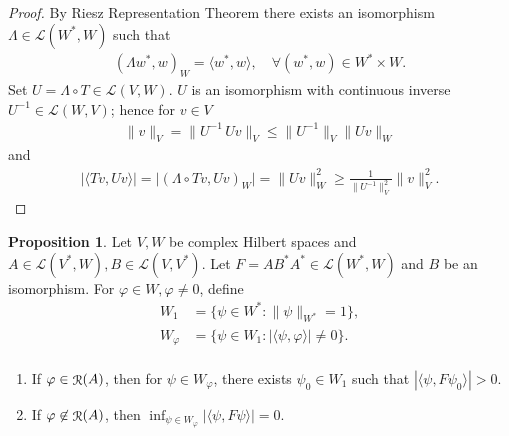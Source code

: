 \documentclass[a4paper,12pt]{article}
\theoremstyle{definition}
\newtheorem{prp}{Proposition}
\DeclareMathOperator\img{\EuScript{R}}
\begin{document}
\begin{proof}
  By Riesz Representation Theorem there exists an isomorphism $\Lambda\in\mathcal{L}(W^*, W)$ such that
  \begin{align*}
    (\Lambda w^*, w)_W = \langle w^*, w\rangle,\quad\forall(w^*, w)\in W^*\times W. 
  \end{align*}
  Set $U = \Lambda\circ T\in\mathcal{L}(V, W)$. $U$ is an isomorphism with continuous inverse $U^{-1}\in\mathcal{L}(W, V)$; hence for $v\in V$
  \begin{align*}
    \|v\|_V=\|U^{-1}\,Uv\|_V\leqslant\|U^{-1}\|_V\|Uv\|_W 
  \end{align*}
and
  \begin{align*}
    \bigl|\langle Tv, Uv\rangle\bigr|=\bigl|(\Lambda\circ Tv, Uv)_W\bigr| = \|Uv\|^2_W\geqslant\frac{1}{\|U^{-1}\|_V^2}\|v\|_V^2. 
  \end{align*}
\end{proof}

\begin{prp}
  Let $V, W$ be complex Hilbert spaces and $A\in\mathcal{L}(V^*, W), B\in\mathcal{L}(V, V^*)$. Let $F = AB^*A^*\in\mathcal{L}(W^*, W)$ and $B$ be an isomorphism. For $\varphi\in W, \varphi\not=0$, define
  \begin{align*}
    W_1 &= \{\psi\in W^*: \|\psi\|_{W^*}=1\}, \\
    W_\varphi &= \{\psi\in W_1: |\langle\psi, \varphi\rangle|\not=0\}.\\
  \end{align*}

  \begin{enumerate}
    \item If $\varphi\in\img(A)$, then for $\psi\in W_\varphi$, there exists $\psi_0\in W_1$ such that $|\langle\psi, F\psi_0\rangle| > 0.$
    \item If $\varphi\not\in\img(A)$, then $\inf_{\psi\in W_\varphi}|\langle\psi, F\psi\rangle| = 0$. 
  \end{enumerate}
\end{prp}
\end{document}
